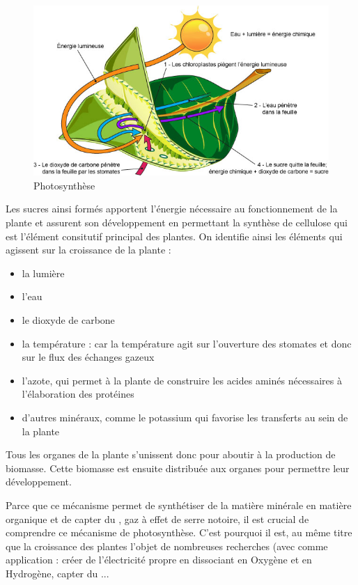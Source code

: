 \begin{figure}[h]
	\begin{center}
  \includegraphics[scale=0.51]{./img/photosynthese.jpg}
  \caption{Photosynthèse}
  \label{fig:photosynthèse}
	\end{center}
\end{figure}

Les sucres ainsi formés apportent l'énergie nécessaire au fonctionnement de la plante et assurent son développement en permettant la synthèse de cellulose qui est l'élément consitutif principal des plantes.
On identifie ainsi les éléments qui agissent sur la croissance de la plante : 
\begin{itemize}
	\item la lumière
	\item l'eau
	\item le dioxyde de carbone
	\item la température : car la température agit sur l'ouverture des stomates et donc sur le flux des échanges gazeux
	\item l'azote, qui permet à la plante de construire les acides aminés nécessaires à l'élaboration des protéines
	\item d'autres minéraux, comme le potassium qui favorise les transferts au sein de la plante
\end{itemize}

Tous les organes de la plante s'unissent donc pour aboutir à la production de biomasse. Cette biomasse est ensuite distribuée aux organes pour permettre leur développement.

Parce que ce mécanisme permet de synthétiser de la matière minérale en matière organique et de capter du , gaz à effet de serre notoire, il est crucial de comprendre ce mécanisme de photosynthèse. C'est pourquoi il est, au même titre que la croissance des plantes l'objet de nombreuses recherches (avec comme application : créer de l'électricité propre en dissociant  en Oxygène et en Hydrogène, capter du ...

